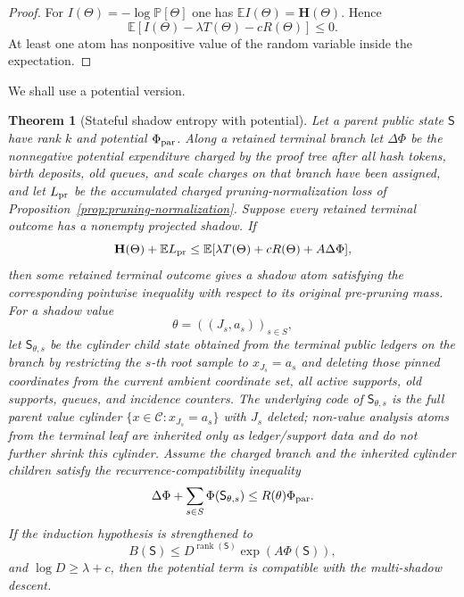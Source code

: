 \documentclass[11pt]{article}
\newtheorem{theorem}{Theorem}[section]
\newcommand{\C}{\mathcal C}
\newcommand{\Prb}{\mathbb P}
\newcommand{\EE}{\mathbb E}
\newcommand{\bfH}{\mathbf H}
\newcommand{\rank}{\operatorname{rank}}
\begin{document}
\begin{proof}
For $I(\Theta)=-\log\Prb[\Theta]$ one has
$\EE I(\Theta)=\bfH(\Theta)$.  Hence
\[
  \EE[I(\Theta)-\lambda T(\Theta)-cR(\Theta)]\le 0.
\]
At least one atom has nonpositive value of the random variable inside the
expectation.
\end{proof}

We shall use a potential version.

\begin{theorem}[Stateful shadow entropy with potential]
\label{thm:shadow-potential}
Let a parent public state $\mathsf S$ have rank $k$ and potential
$\Phi_{\rm par}$.  Along a retained terminal branch let $\Delta\Phi$ be the
nonnegative potential expenditure charged by the proof tree after all hash
tokens, birth deposits, old queues, and scale charges on that branch have been
assigned, and let $L_{\rm pr}$ be the accumulated charged pruning-normalization
loss of Proposition~\ref{prop:pruning-normalization}.
Suppose every retained terminal outcome has a nonempty projected shadow.  If
\[
  \bfH(\Theta)+\EE L_{\rm pr}
  \le
  \EE[\lambda T(\Theta)+cR(\Theta)+A\Delta\Phi],
\]
then some retained terminal outcome gives a shadow atom satisfying the
corresponding pointwise inequality with respect to its original pre-pruning
mass.  For a
shadow value
\[
  \theta=((J_s,a_s))_{s\in S},
\]
let $\mathsf S_{\theta,s}$ be the cylinder child state obtained from the
terminal public ledgers on the branch by restricting the $s$-th root sample to
$x_{J_s}=a_s$ and deleting those pinned coordinates from the current ambient
coordinate set, all active supports, old supports, queues, and incidence
counters.  The underlying code of $\mathsf S_{\theta,s}$ is the full parent
value cylinder $\{x\in\C:x_{J_s}=a_s\}$ with $J_s$ deleted; non-value
analysis atoms from the terminal leaf are inherited only as ledger/support data
and do not further shrink this cylinder.  Assume the charged branch and the
inherited cylinder children
satisfy the recurrence-compatibility
inequality
\[
  \Delta\Phi+\sum_{s\in S}\Phi(\mathsf S_{\theta,s})
  \le R(\theta)\Phi_{\rm par}.
\]
If the induction hypothesis is strengthened to
\[
  B(\mathsf S)\le D^{\rank(\mathsf S)}\exp(A\Phi(\mathsf S)),
\]
and $\log D\ge\lambda+c$, then the potential term is compatible with the
multi-shadow descent.
\end{theorem}
\end{document}
